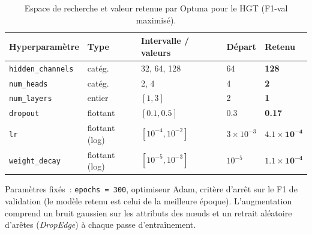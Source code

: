 \label{ann:hyp-hgt}

\begin{table}[H]
    \centering
    \small
    \caption{Espace de recherche et valeur retenue par Optuna pour le HGT (F1-val maximis\'e).}
    \label{tab:hyp-hgt}
    \begin{tabular}{lllll}
        \hline
        Hyperparam\`etre  & Type           & Intervalle / valeurs       & D\'epart            & \textbf{Retenu}               \\
        \hline
        \texttt{hidden\_channels} & cat\'eg. & 32, 64, 128              & 64                  & \textbf{128}                  \\
        \texttt{num\_heads}       & cat\'eg. & 2, 4                     & 4                   & \textbf{2}                    \\
        \texttt{num\_layers}      & entier   & $[1, 3]$                 & 2                   & \textbf{1}                    \\
        \texttt{dropout}          & flottant & $[0.1, 0.5]$             & 0.3                 & \textbf{0.17}                 \\
        \texttt{lr}               & flottant (log) & $[10^{-4}, 10^{-2}]$ & $3\times10^{-3}$  & $\mathbf{4.1\times10^{-4}}$   \\
        \texttt{weight\_decay}    & flottant (log) & $[10^{-5}, 10^{-3}]$ & $10^{-5}$          & $\mathbf{1.1\times10^{-4}}$   \\
        \hline
    \end{tabular}
\end{table}

Param\`etres fix\'es~: \texttt{epochs = 300}, optimiseur Adam, crit\`ere d'arr\^et sur le F1 de validation (le mod\`ele retenu est celui de la meilleure \'epoque). L'augmentation comprend un bruit gaussien sur les attributs des n\oe uds et un retrait al\'eatoire d'ar\^etes (\emph{DropEdge}) \`a chaque passe d'entra\^inement.

\myRestoreMarks
